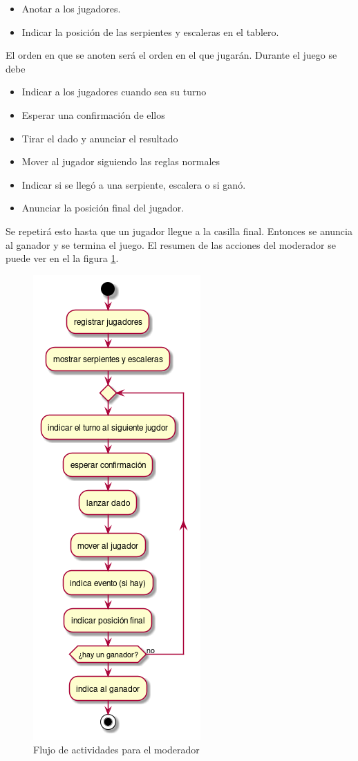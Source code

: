 \documentclass[11pt]{article}
\begin{document}
\begin{itemize}
\item Anotar a los jugadores.
\item Indicar la posición de las serpientes y escaleras en el tablero.
\end{itemize}

El orden en que se anoten será el orden en el que jugarán. Durante el juego se
debe

\begin{itemize}
\item Indicar a los jugadores cuando sea su turno
\item Esperar una confirmación de ellos
\item Tirar el dado y anunciar el resultado
\item Mover al jugador siguiendo las reglas normales
\item Indicar si se llegó a una serpiente, escalera o si ganó.
\item Anunciar la posición final del jugador.
\end{itemize}

Se repetirá esto hasta que un jugador llegue a la casilla final. Entonces se
anuncia al ganador y se termina el juego. El resumen de las acciones del
moderador se puede ver en el la figura \ref{fig:mod-flux}.

\begin{figure}[htbp]
\centering
\includegraphics[scale=0.75]{imgs/moderador_flux.png}
\caption{\label{fig:mod-flux}Flujo de actividades para el moderador}
\end{figure}
\end{document}
